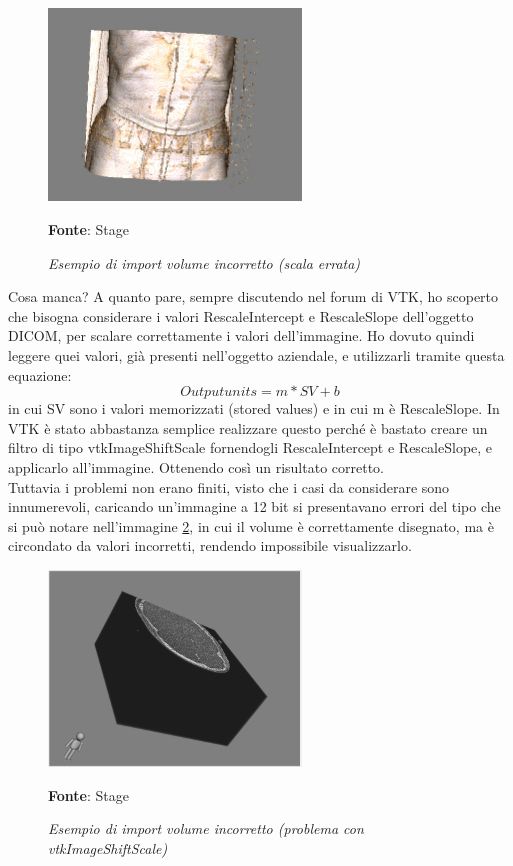 \begin{figure}[h]
    \centering
    \includegraphics[width=0.6\textwidth]{immagini/svolgimento/volumebrokenscale.jpeg}
    \caption{\textit{Esempio di import volume incorretto (scala errata)}}
    \textbf{Fonte}: Stage
    \label{fig: Volume Wrong Scale}
\end{figure}

Cosa manca? A quanto pare, sempre discutendo nel forum di VTK, ho scoperto che bisogna considerare i valori RescaleIntercept e RescaleSlope dell'oggetto DICOM, per scalare correttamente i valori dell'immagine. Ho dovuto quindi leggere quei valori, già presenti nell'oggetto aziendale, e utilizzarli tramite questa equazione:
\[ Output units = m*SV+b \]
in cui SV sono i valori memorizzati (stored values) e in cui m è RescaleSlope. In VTK è stato abbastanza semplice realizzare questo perché è bastato creare un filtro di tipo vtkImageShiftScale fornendogli RescaleIntercept e RescaleSlope, e applicarlo all'immagine. Ottenendo così un risultato corretto.
\\
Tuttavia i problemi non erano finiti, visto che i casi da considerare sono innumerevoli, caricando un'immagine a 12 bit si presentavano errori del tipo che si può notare nell'immagine \ref{fig: Volume Wrong Value}, in cui il volume è correttamente disegnato, ma è circondato da valori incorretti, rendendo impossibile visualizzarlo.

\begin{figure}[h]
    \centering
    \includegraphics[width=0.6\textwidth]{immagini/svolgimento/volumebroken12bit.png}
    \caption{\textit{Esempio di import volume incorretto (problema con vtkImageShiftScale)}}
    \textbf{Fonte}: Stage
    \label{fig: Volume Wrong Value}
\end{figure}

